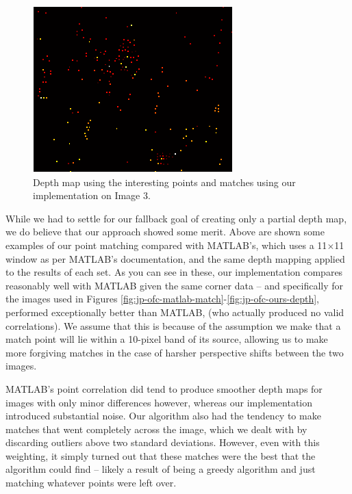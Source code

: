 \begin{figure}[H]\centering
	\includegraphics[width=0.8\linewidth]{Images/03_our_depth.png}
	\caption{Depth map using the interesting points and matches using our implementation on Image 3.}
	\label{fig:grid-example}
\end{figure}

While we had to settle for our fallback goal of creating only a partial depth map, we do believe that our approach showed some merit. Above are shown some examples of our point matching compared with MATLAB's, which uses a 11$\times$11 window as per MATLAB's documentation, and the same depth mapping applied to the results of each set. As you can see in these, our implementation compares reasonably well with MATLAB given the same corner data -- and specifically for the images used in Figures \ref{fig:jp-ofc-matlab-match}-\ref{fig:jp-ofc-ours-depth}, performed exceptionally better than MATLAB, (who actually produced no valid correlations). We assume that this is because of the assumption we make that a match point will lie within a 10-pixel band of its source, allowing us to make more forgiving matches in the case of harsher perspective shifts between the two images.

MATLAB's point correlation did tend to produce smoother depth maps for images with only minor differences however, whereas our implementation introduced substantial noise. Our algorithm also  had the tendency to make matches that went completely across the image, which we dealt with by discarding outliers above two standard deviations. However, even with this weighting, it simply turned out that these matches were the best that the algorithm could find -- likely a result of being a greedy algorithm and just matching whatever points were left over. 